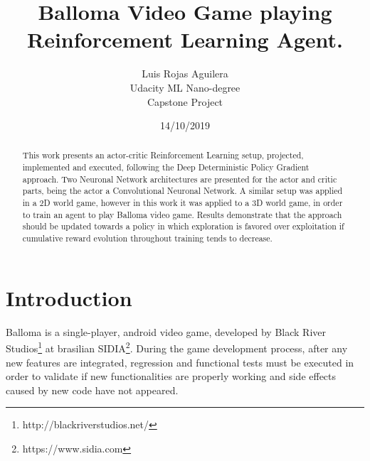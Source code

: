 \documentclass[peerreview,onecolumn]{IEEEtran}
\begin{document}
\title{Balloma Video Game playing Reinforcement Learning Agent.}



\author{Luis Rojas Aguilera \\
Udacity ML Nano-degree\\
Capstone Project\\
}
\date{14/10/2019}

\maketitle
\tableofcontents
\listoffigures
\listoftables

\IEEEpeerreviewmaketitle
\begin{abstract}

	This work presents an actor-critic Reinforcement Learning setup, projected, implemented and executed, following the Deep Deterministic Policy Gradient approach. Two Neuronal Network architectures are presented for the actor and critic parts, being the actor a Convolutional Neuronal Network. A similar setup was applied in a 2D world game, however in this work it was applied to a 3D world game, in order to train an agent to play Balloma video game. Results demonstrate that the approach should be updated towards a policy in which exploration is favored over exploitation if cumulative reward evolution throughout training tends to decrease. 
	
\end{abstract}


\section{Introduction}
Balloma is a single-player, android video game, developed by Black River Studios\footnote{http://blackriverstudios.net/} at brasilian SIDIA\footnote{https://www.sidia.com}.  During the game development process, after any new features are integrated, regression and functional tests must be executed in order to validate if new functionalities are properly working and side effects caused by new code have not appeared. 
\end{document}
